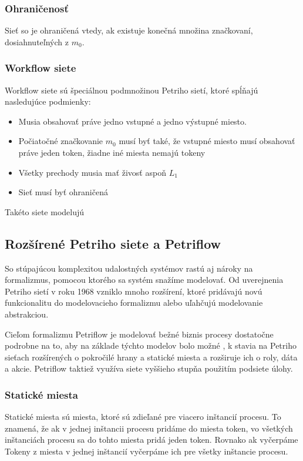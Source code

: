 \subsubsection{Ohraničenosť}
Sieť so je ohraničená vtedy, ak existuje konečná množina značkovaní, dosiahnuteľných z $m_0$.

\subsubsection{Workflow siete}
Workflow siete sú špeciálnou podmnožinou Petriho sietí, ktoré spĺňajú nasledujúce podmienky:
\begin{itemize}
\item Musia obsahovať práve jedno vstupné a jedno výstupné miesto.
\item Počiatočné značkovanie $m_0$ musí byť také, že vstupné miesto musí obsahovať práve jeden token, žiadne iné miesta nemajú tokeny
\item Všetky prechody musia mať živosť aspoň $L_1$ 
\item Sieť musí byť ohraničená
\end{itemize}
Takéto siete modelujú 

\subsection{Rozšírené Petriho siete a Petriflow}

So stúpajúcou komplexitou udalostných systémov rastú aj nároky na formalizmus, pomocou ktorého sa systém snažíme modelovať. 
Od uverejnenia Petriho sietí v roku 1968 vzniklo mnoho rozšírení, ktoré pridávajú novú funkcionalitu do modelovacieho formalizmu alebo uľahčujú modelovanie abstrakciou. 

Cieľom formalizmu Petriflow je modelovať bežné biznis procesy dostatočne podrobne na to, aby na základe týchto modelov bolo možné , k stavia na Petriho sieťach rozšírených o pokročilé hrany a statické miesta a rozširuje ich o roly, dáta a akcie. Petriflow taktiež využíva siete vyššieho stupňa použitím podsiete úlohy.



\subsubsection{Statické miesta}
Statické miesta sú miesta, ktoré sú zdieľané pre viacero inštancií procesu.  To znamená, že ak v jednej inštancii procesu pridáme do miesta token, vo všetkých inštanciách procesu sa do tohto miesta pridá jeden token. Rovnako ak vyčerpáme Tokeny z miesta v jednej inštancií vyčerpáme ich pre všetky inštancie procesu. 

